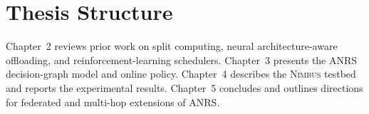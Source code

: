 \section{Thesis Structure}

Chapter~2 reviews prior work on split computing, neural architecture-aware offloading, and reinforcement-learning schedulers. Chapter~3 presents the ANRS decision-graph model and online policy. Chapter~4 describes the \textsc{Nimbus} testbed and reports the experimental results. Chapter~5 concludes and outlines directions for federated and multi-hop extensions of ANRS.

